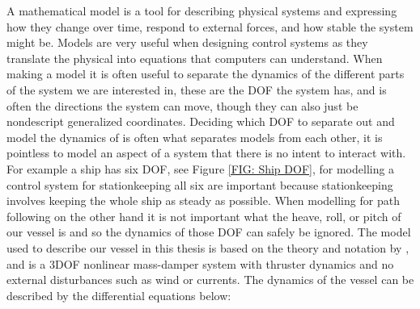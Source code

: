 A mathematical model is a tool for describing physical systems and expressing how they change over time, respond to external forces, and how stable the system might be. Models are very useful when designing control systems as
they translate the physical into equations that computers can understand. When making a model it is often useful to separate the dynamics of the different parts of the 
system we are interested in, these are the \gls{DOF} the system has, and is often the directions the system can move, though they can also just be
nondescript generalized coordinates. Deciding which \gls{DOF} to separate out and model the dynamics of is often what separates models from each other, it is pointless to model
an aspect of a system that there is no intent to interact with. For example a ship has six \gls{DOF}, see Figure \ref{FIG: Ship DOF}, for modelling a control system for stationkeeping
all six are important because stationkeeping involves keeping the whole ship as steady as possible. When modelling for path following on the other hand it is not
important what the heave, roll, or pitch of our vessel is and so the dynamics of those \gls{DOF} can safely be ignored. 
The model used to describe our vessel in this thesis is based on the theory and notation by \cite{fossen2011handbook}, and is a 3\gls{DOF} nonlinear mass-damper system with
thruster dynamics and no external disturbances such as wind or currents. The dynamics of the vessel can be described by the differential equations below:


